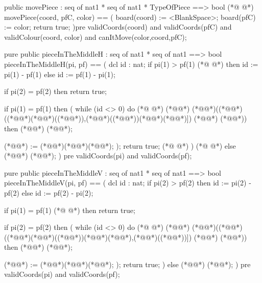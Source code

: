 \begin{vdmpp}[breaklines=true]
 
 public movePiece : seq of nat1 * seq of nat1 * TypeOfPiece ==> bool
(*@
\label{moveV:80}
@*)
 movePiece(coord, pfC, color) ==
 (
  board(coord) := <BlankSpace>;
  board(pfC) := color;
  return true;
 )pre validCoords(coord) and validCoords(pfC) and validColour(coord, color) and canItMove(color,coord,pfC);
 
 
 pure public pieceInTheMiddleH : seq of nat1 * seq of nat1 ==> bool
 pieceInTheMiddleH(pi, pf) ==
 (
  dcl id : nat;
  if pi(1) > pf(1)
(*@
\label{moveH:93}
@*)
  then id := pi(1) - pf(1)
  else id := pf(1) - pi(1);
  
  
  if pi(2) = pf(2)
  then return true;
  
  if pi(1) = pf(1)
  then
  (
   while (id <> 0)
   do
(*@
\label{movePiece:105}
@*)
   (*@\vdmnotcovered{(}@*) 
    (*@@*)((*@@*)((*@\vdmnotcovered{[}@*)(*@@*)((*@@*)),(*@@*)((*@@*))(*@\vdmnotcovered{+}@*)(*@@*)]) (*@\vdmnotcovered{<>}@*) (*@@*))
    then (*@@*) (*@@*);
    
    (*@@*) := (*@@*)(*@\vdmnotcovered{-}@*)(*@@*);
   );
   return true;
(*@
\label{pieceCannotBeCapture:112}
@*)
  ) 
(*@
\label{pieceInTheMiddleH:113}
@*)
  else (*@@*) (*@@*);
 ) pre validCoords(pi) and validCoords(pf);
 
 
 pure public pieceInTheMiddleV : seq of nat1 * seq of nat1 ==> bool
 pieceInTheMiddleV(pi, pf) ==
 (
  dcl id : nat;
  if pi(2) > pf(2)
  then id := pi(2) - pf(2)
  else id := pf(2) - pi(2);
 
  if pi(1) = pf(1) 
(*@
\label{pieceCapturedH:126}
@*)
  then return true;
  
  if pi(2) = pf(2)
  then
  (
   while (id <> 0)
   do
(*@
\label{pieceInTheMiddleV:133}
@*)
   (*@\vdmnotcovered{(}@*) 
    (*@@*)((*@@*)((*@\vdmnotcovered{[}@*)(*@@*)((*@@*))(*@\vdmnotcovered{+}@*)(*@@*),(*@@*)((*@@*))]) (*@\vdmnotcovered{<>}@*) (*@@*))
    then (*@@*) (*@@*);
    
    (*@@*) := (*@@*)(*@\vdmnotcovered{-}@*)(*@@*);
   );
   return true;
  ) 
  else (*@@*) (*@@*);
 ) pre validCoords(pi) and validCoords(pf);
 

\end{vdmpp}

